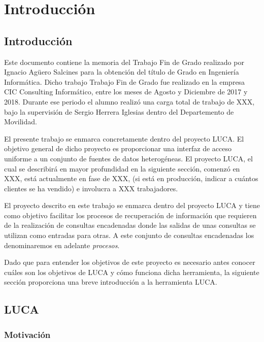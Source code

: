 \chapter{Introducción}

\minitoc
	
\section{Introducción}

Este documento contiene la memoria del Trabajo Fin de Grado realizado por Ignacio Agüero Salcines para la obtención del título de Grado en Ingeniería Informática. Dicho trabajo Trabajo Fin de Grado fue realizado en la empresa CIC Consulting Informático, entre los meses de Agosto y Diciembre de 2017 y 2018. Durante ese periodo el alumno realizó una carga total de trabajo de XXX, bajo la supervisión de Sergio Herrera Iglesias dentro del Departemento de Movilidad.

El presente trabajo se enmarca concretamente dentro del proyecto LUCA. El objetivo general de dicho proyecto es proporcionar una interfaz de acceso uniforme a un conjunto de fuentes de datos heterogéneas. El proyecto LUCA, el cual se describirá en mayor profundidad en la siguiente sección, comenzó en XXX, está actualmente en fase de XXX, (si está en producción, indicar a cuántos clientes se ha vendido) e involucra a XXX trabajadores.

El proyecto descrito en este trabajo se enmarca dentro del proyecto LUCA y tiene como objetivo facilitar los procesos de recuperación de información que requieren de la realización de consultas encadenadas donde las salidas de unas consultas se utilizan como entradas para otras. A este conjunto de consultas encadenadas los denominaremos en adelante \emph{procesos}. 

Dado que para entender los objetivos de este proyecto es necesario antes conocer cuáles son los objetivos de LUCA y cómo funciona dicha herramienta, la siguiente sección proporciona una breve introducción a la herramienta LUCA.

\section{LUCA}

\subsection{Motivación}

